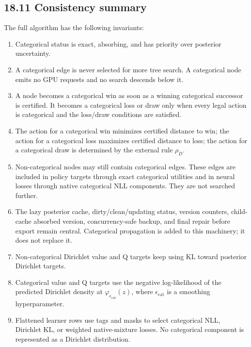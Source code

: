 \documentclass[11pt]{article}
\newcommand{\epscat}{\epsilon_{\mathrm{cat}}}
\newcommand{\CatPoint}{\varphi_{\epsilon_{\mathrm{cat}}}}
\begin{document}
\subsection*{18.11 Consistency summary}

The full algorithm has the following invariants:

\begin{enumerate}[leftmargin=2em]
  \item Categorical status is exact, absorbing, and has priority over posterior
  uncertainty.

  \item A categorical edge is never selected for more tree search. A
  categorical node emits no GPU requests and no search descends below it.

  \item A node becomes a categorical win as soon as a winning categorical
  successor is certified. It becomes a categorical loss or draw only when every
  legal action is categorical and the loss/draw conditions are satisfied.

  \item The action for a categorical win minimizes certified distance to win;
  the action for a categorical loss maximizes certified distance to loss; the
  action for a categorical draw is determined by the external rule \(\rho_D\).

  \item Non-categorical nodes may still contain categorical edges. These edges
  are included in policy targets through exact categorical utilities and in
  neural losses through native categorical NLL components. They are not searched
  further.

  \item The lazy posterior cache, dirty/clean/updating status, version counters,
  child-cache absorbed version, concurrency-safe backup, and final repair before
  export remain central. Categorical propagation is added to this machinery; it
  does not replace it.

  \item Non-categorical Dirichlet value and Q targets keep using KL toward
  posterior Dirichlet targets.

  \item Categorical value and Q targets use the negative log-likelihood of the
  predicted Dirichlet density at \(\CatPoint(z)\), where \(\epscat\) is a
  smoothing hyperparameter.

  \item Flattened learner rows use tags and masks to select categorical NLL,
  Dirichlet KL, or weighted native-mixture losses. No categorical component is
  represented as a Dirichlet distribution.
\end{enumerate}
\end{document}

